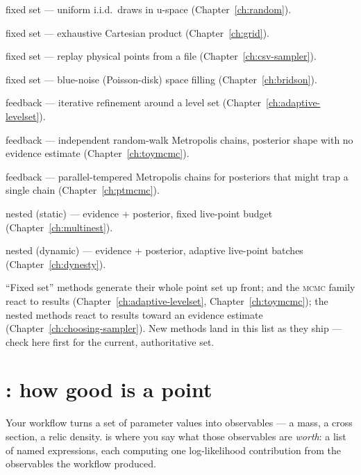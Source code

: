\begin{description}[leftmargin=1.6em]
  \item[\sampler{Random}] fixed set --- uniform i.i.d.\ draws in u-space
        (Chapter~\ref{ch:random}).
  \item[\sampler{Grid}] fixed set --- exhaustive Cartesian product
        (Chapter~\ref{ch:grid}).
  \item[\sampler{CSV}] fixed set --- replay physical points from a file
        (Chapter~\ref{ch:csv-sampler}).
  \item[\sampler{Bridson}] fixed set --- blue-noise (Poisson-disk) space filling
        (Chapter~\ref{ch:bridson}).
  \item[\sampler{AdaptiveBridson}] feedback --- iterative refinement around a level set
        (Chapter~\ref{ch:adaptive-levelset}).
  \item[\sampler{ToyMCMC}] feedback --- independent random-walk Metropolis chains,
        posterior shape with no evidence estimate (Chapter~\ref{ch:toymcmc}).
  \item[\sampler{PTMCMC}] feedback --- parallel-tempered Metropolis chains for
        posteriors that might trap a single chain (Chapter~\ref{ch:ptmcmc}).
  \item[\sampler{MultiNest}] nested (static) --- evidence + posterior, fixed
        live-point budget (Chapter~\ref{ch:multinest}).
  \item[\sampler{Dynesty}] nested (dynamic) --- evidence + posterior, adaptive
        live-point batches (Chapter~\ref{ch:dynesty}).
\end{description}

``Fixed set'' methods generate their whole point set up front; 
and the \textsc{mcmc} family react to results (Chapter~\ref{ch:adaptive-levelset},
Chapter~\ref{ch:toymcmc}); the nested methods react to results toward an evidence
estimate (Chapter~\ref{ch:choosing-sampler}). New methods land in this list as they
ship --- check here first for the current, authoritative set.

\section{: how good is a point}
\label{sec:sampling-loglikelihood}

Your workflow turns a set of parameter values into observables --- a mass, a cross
section, a relic density.  is where you say what those observables
are \emph{worth}: a list of named expressions, each computing one log-likelihood
contribution from the observables the workflow produced.

